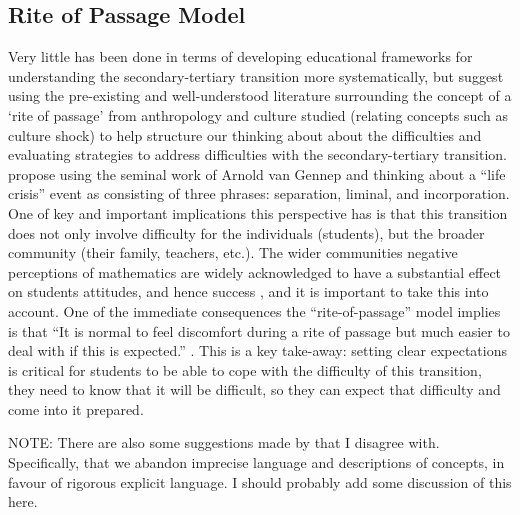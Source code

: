 \documentclass[twoside,12pt,a4paper]{report}
\begin{document}
\subsection*{Rite of Passage Model}

Very little has been done in terms of developing educational frameworks for understanding the secondary-tertiary transition more systematically, but  suggest using the pre-existing and well-understood literature surrounding the concept of a `rite of passage' from anthropology and culture studied (relating concepts such as culture shock) to help structure our thinking about about the difficulties and evaluating strategies to address difficulties with the secondary-tertiary transition.  propose using the seminal work of Arnold van Gennep and thinking about a ``life crisis'' event as consisting of three phrases: separation, liminal, and incorporation. One of key and important implications this perspective has is that this transition does not only involve difficulty for the individuals (students), but the broader community (their family, teachers, etc.). The wider communities negative perceptions of mathematics are widely acknowledged to have a substantial effect on students attitudes, and hence success \cite{King2015, Gordon2013}, and it is important to take this into account. One of the immediate consequences the ``rite-of-passage'' model implies is that ``It is normal to feel
discomfort during a rite of passage but much easier to deal with if this is expected.'' \cite{Clark2008}. This is a key take-away: setting clear expectations is critical for students to be able to cope with the difficulty of this transition, they need to know that it will be difficult, so they can expect that difficulty and come into it prepared. 

{\color{red}
NOTE: There are also some suggestions made by  that I disagree with. Specifically, that we abandon imprecise language and descriptions of concepts, in favour of rigorous explicit language. I should probably add some discussion of this here.
}
\end{document}

